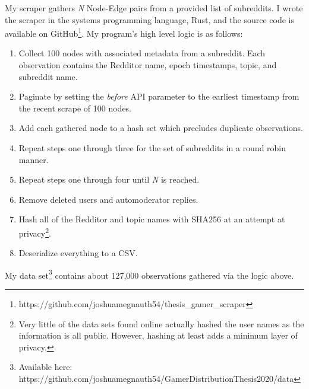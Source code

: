 \documentclass[12pt, a4paper]{article}
\begin{document}
My scraper gathers \textit{N} Node-Edge pairs from a provided list of subreddits. I wrote the scraper in the systems programming language, Rust, and the source code is available on GitHub\footnote{https://github.com/joshuamegnauth54/thesis\_gamer\_scraper}. My program's high level logic is as follows: 

\begin{enumerate}
  \item Collect 100 nodes with associated metadata from a subreddit. Each observation contains the Redditor name, epoch timestamps, topic, and subreddit name.
  \item Paginate by setting the \textit{before} API parameter to the earliest timestamp from the recent scrape of 100 nodes.
  \item Add each gathered node to a hash set which precludes duplicate observations.
  \item Repeat steps one through three for the set of subreddits in a round robin manner.
  \item Repeat steps one through four until \textit{N} is reached.
  \item Remove deleted users and automoderator replies.
  \item Hash all of the Redditor and topic names with SHA256 at an attempt at privacy\footnote{Very little of the data sets found online actually hashed the user names as the information is all public. However, hashing at least adds a minimum layer of privacy.}.
  \item Deserialize everything to a CSV.
\end{enumerate}

My data set\footnote{Available here: https://github.com/joshuamegnauth54/GamerDistributionThesis2020/data} contains about 127,000 observations gathered via the logic above.

\printbibliography
\end{document}
